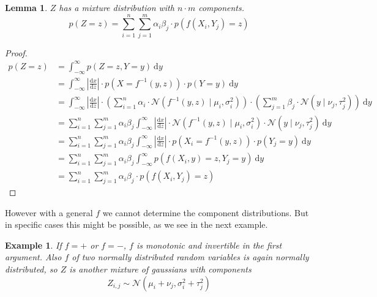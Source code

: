 \documentclass[11pt]{article}
\newtheorem{lemma}{Lemma}
\newtheorem{example}{Example}
\begin{document}
\begin{lemma}
  $Z$ has a mixture distribution with $n \cdot m$ components.
  \begin{equation*}
    p(Z = z) = \sum_{i = 1}^{n} \sum_{j = 1}^{m} \alpha_{i}\beta_{j} \cdot p(f(X_{i}, Y_{j}) = z)
  \end{equation*}
\end{lemma}
\begin{proof}
  \begin{align*}
    p(Z = z) & = \int_{-\infty}^{\infty} p(Z = z, Y = y)~\mathrm{d}y\\
             & = \int_{-\infty}^{\infty} \left| \frac{\mathrm{d}x}{\mathrm{d}z} \right| \cdot p(X = f^{-1}(y, z)) \cdot p(Y = y)~\mathrm{d}y\\
             & = \int_{-\infty}^{\infty} \left| \frac{\mathrm{d}x}{\mathrm{d}z} \right| \cdot \left( \sum_{i = 1}^{n} \alpha_{i} \cdot \mathcal{N}(f^{-1}(y, z) \mid \mu_{i}, \sigma_{i}^{2}) \right) \cdot \left( \sum_{j = 1}^{m} \beta_{j} \cdot \mathcal{N}(y \mid \nu_{j}, \tau_{j}^{2}) \right)~\mathrm{d}y\\
             & = \sum_{i = 1}^{n} \sum_{j = 1}^{m} \alpha_{i}\beta_{j} \int_{-\infty}^{\infty} \left| \frac{\mathrm{d}x}{\mathrm{d}z} \right| \cdot \mathcal{N}(f^{-1}(y, z) \mid \mu_{i}, \sigma_{i}^{2}) \cdot \mathcal{N}(y \mid \nu_{j}, \tau_{j}^{2})~\mathrm{d}y\\
             & = \sum_{i = 1}^{n} \sum_{j = 1}^{m} \alpha_{i}\beta_{j} \int_{-\infty}^{\infty} \left| \frac{\mathrm{d}x}{\mathrm{d}z} \right| \cdot p(X_{i} = f^{-1}(y, z)) \cdot p(Y_{j} = y)~\mathrm{d}y\\
             & = \sum_{i = 1}^{n} \sum_{j = 1}^{m} \alpha_{i}\beta_{j} \int_{-\infty}^{\infty} p(f(X_{i}, y) = z, Y_{j} = y)~\mathrm{d}y\\
             & = \sum_{i = 1}^{n} \sum_{j = 1}^{m} \alpha_{i}\beta_{j} \cdot p(f(X_{i}, Y_{j}) = z)
  \end{align*}
\end{proof}

However with a general $f$ we cannot determine the component distributions. But
in specific cases this might be possible, as we see in the next example.

\begin{example}
  If $f = +$ or $f = -$, $f$ is monotonic and invertible in the first
  argument. Also $f$ of two normally distributed random variables is again
  normally distributed, so $Z$ is another mixture of gaussians with components
  \begin{equation*}
    Z_{i,j} \sim \mathcal{N}(\mu_{i} + \nu_{j}, \sigma_{i}^{2} + \tau_{j}^{2})
  \end{equation*}
\end{example}
\end{document}
